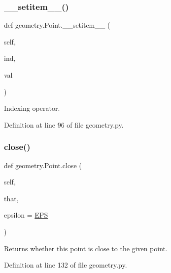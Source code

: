 \mbox{\label{classgeometry_1_1Point_aae8560cc5718faf25f3cb70942a32395}} 
\subsubsection{\texorpdfstring{\+\_\+\+\_\+setitem\+\_\+\+\_\+()}{\_\_setitem\_\_()}}
{\footnotesize\ttfamily def geometry.\+Point.\+\_\+\+\_\+setitem\+\_\+\+\_\+ (\begin{DoxyParamCaption}\item[{}]{self,  }\item[{}]{ind,  }\item[{}]{val }\end{DoxyParamCaption})}



Indexing operator. 



Definition at line 96 of file geometry.\+py.

\mbox{\label{classgeometry_1_1Point_ab9ec6d1fd080ba8b7eb99e5832505c85}} 
\subsubsection{\texorpdfstring{close()}{close()}}
{\footnotesize\ttfamily def geometry.\+Point.\+close (\begin{DoxyParamCaption}\item[{}]{self,  }\item[{}]{that,  }\item[{}]{epsilon = {\ttfamily \hyperlink{namespacegeometry_a543db87a5e9af9e1d17146559a540276}{E\+PS}} }\end{DoxyParamCaption})}

\begin{DoxyVerb}Returns whether this point is close to the given point.\end{DoxyVerb}
 

Definition at line 132 of file geometry.\+py.

\mbox{\label{classgeometry_1_1Point_aa9a3448e0da24f3132a4ccc7abf191a7}} 
